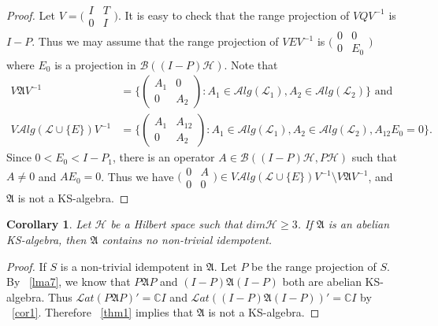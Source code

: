 \documentclass[a4paper,10pt]{amsart}
\newtheorem{corollary}{Corollary}[section]
\theoremstyle{refs}
\newcommand{\AAA}{\mathfrak A}
\newcommand{\BBB}{\mathcal B}
\newcommand{\HHH}{\mathcal H} %
\newcommand{\LLL}{\mathcal L} %
\newcommand{\Lat}{\mathcal Lat}
\newcommand{\Alg}{\mathcal Alg}
\newcommand{\C}{\mathbb C} %
\begin{document}
\begin{proof}
Let $V =
\bigl(\begin{smallmatrix}
           I & T\\
           0 & I
           \end{smallmatrix} \bigr)$.
It is easy to check that the range projection of $VQV^{-1}$ is $I-P$. Thus we
may assume that the range projection
of $VEV^{-1}$ is $
\bigl(\begin{smallmatrix}
           0 & 0\\
           0 & E_{0}
           \end{smallmatrix} \bigr)$ where $E_{0}$ is a projection in
$\BBB((I-P)\HHH)$. Note that
\begin{align*}
V \AAA V^{-1} &=\{\left(\begin{array}{cc}A_{1} & 0\\0 & A_{2}\end{array}\right):
A_{1}\in\Alg(\LLL_{1}),A_{2}\in\Alg(\LLL_{2})\} \mbox{ and} \\
V \Alg(\LLL\cup\{E\}) V^{-1}
&=\{\left(\begin{array}{cc}A_{1}&A_{12}\\0&A_{2}\end{array}\right):
A_{1}\in\Alg(\LLL_{1}),A_{2}\in\Alg(\LLL_{2}),A_{12}E_{0}=0\}.
\end{align*}
Since $0<E_{0}<I-P_{1}$, there is an operator $A\in\BBB((I-P)\HHH,P\HHH)$ such
that $A \neq 0$ and
$AE_{0}=0$. Thus we have
$\bigl(\begin{smallmatrix}
           0 & A\\
           0 & 0
           \end{smallmatrix} \bigr) \in
V\Alg(\LLL\cup\{E\})V^{-1} \setminus V\AAA V^{-1}$, and $\AAA$ is not
a KS-algebra.
\end{proof}

\begin{corollary} \label{cor3}
Let $\HHH$ be a Hilbert space such that $dim\HHH \geq 3$. If $\AAA$ is an
abelian KS-algebra, then $\AAA$ contains no non-trivial idempotent.
\end{corollary}

\begin{proof}
If $S$ is a non-trivial idempotent in $\AAA$. Let $P$ be the range projection
of $S$. By ~\cref{lma7}, we know that $P\AAA P$ and $(I-P)\AAA
(I-P)$ both are
abelian KS-algebra. Thus $\Lat(P\AAA P)' = \C I$ and $\Lat((I-P)\AAA (I-P))' =
\C I$ by ~\cref{cor1}. Therefore ~\cref{thm1} implies that $\AAA$ is not
a KS-algebra.
\end{proof}
\end{document}
